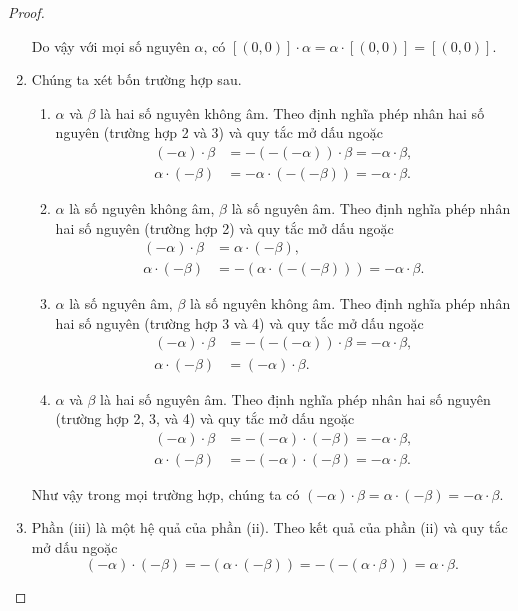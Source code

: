 \begin{proof}
\begin{enumerate}[label={(\roman*)}]
              Do vậy với mọi số nguyên $\alpha$, có $[(0, 0)]\cdot\alpha = \alpha\cdot[(0,0)] = [(0,0)]$.
        \item Chúng ta xét bốn trường hợp sau.
              \begin{enumerate}[label={\textbf{Trường hợp \arabic*.}},itemindent=1.5cm]
                  \item $\alpha$ và $\beta$ là hai số nguyên không âm. Theo định nghĩa phép nhân hai số nguyên (trường hợp 2 và 3) và quy tắc mở dấu ngoặc
                        \begin{align*}
                            (-\alpha)\cdot\beta & = -(-(-\alpha))\cdot \beta = -\alpha\cdot\beta, \\
                            \alpha\cdot(-\beta) & = -\alpha\cdot (-(-\beta)) = -\alpha\cdot\beta.
                        \end{align*}
                  \item $\alpha$ là số nguyên không âm, $\beta$ là số nguyên âm. Theo định nghĩa phép nhân hai số nguyên (trường hợp 2) và quy tắc mở dấu ngoặc
                        \begin{align*}
                            (-\alpha)\cdot\beta  & = \alpha\cdot (-\beta),                          \\
                            \alpha\cdot (-\beta) & = -(\alpha\cdot(-(-\beta))) = -\alpha\cdot\beta.
                        \end{align*}
                  \item $\alpha$ là số nguyên âm, $\beta$ là số nguyên không âm. Theo định nghĩa phép nhân hai số nguyên (trường hợp 3 và 4) và quy tắc mở dấu ngoặc
                        \begin{align*}
                            (-\alpha)\cdot\beta & = -(-(-\alpha))\cdot\beta = -\alpha\cdot\beta, \\
                            \alpha\cdot(-\beta) & = (-\alpha)\cdot\beta.
                        \end{align*}
                  \item $\alpha$ và $\beta$ là hai số nguyên âm. Theo định nghĩa phép nhân hai số nguyên (trường hợp 2, 3, và 4) và quy tắc mở dấu ngoặc
                        \begin{align*}
                            (-\alpha)\cdot\beta & = -(-\alpha)\cdot(-\beta) = -\alpha\cdot\beta, \\
                            \alpha\cdot(-\beta) & = -(-\alpha)\cdot(-\beta) = -\alpha\cdot\beta.
                        \end{align*}
              \end{enumerate}

              Như vậy trong mọi trường hợp, chúng ta có $(-\alpha)\cdot\beta = \alpha\cdot(-\beta) = -\alpha\cdot\beta$.
        \item Phần (iii) là một hệ quả của phần (ii). Theo kết quả của phần (ii) và quy tắc mở dấu ngoặc
              \[
                  (-\alpha)\cdot (-\beta) = -(\alpha\cdot(-\beta)) = -(-(\alpha\cdot\beta)) = \alpha\cdot\beta.
              \]
    \end{enumerate}
\end{proof}

